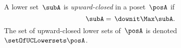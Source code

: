 \begin{definition}
    \label{def:upward-closed-lowerset}
    A lower set~$\subA$ is \emph{upward-closed} in a poset~$\posA$ if
    \begin{equation}
        \subA =\, \downit  \Max \subA.
    \end{equation}
    The set of upward-closed lower sets of~$\posA$ is denoted~$\setOfUCLowersets \posA$.
\end{definition}
